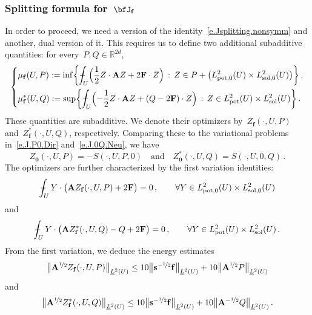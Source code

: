 \documentclass[11pt,twoside]{article} %
\numberwithin{equation}{section}
\theoremstyle{definition}
\let\originalleft\left
\let\originalright\right
\renewcommand{\left}{\mathopen{}\mathclose\bgroup\originalleft}
\renewcommand{\right}{\aftergroup\egroup\originalright}
\newcommand*{\R}{\ensuremath{\mathbb{R}}}
\newcommand{\qand}{\quad \mbox{and} \quad }
\newcommand{\f}{\mathbf{f}}
\newcommand{\s}{\mathbf{s}}
\def\Xint#1{\mathchoice
{\XXint\displaystyle\textstyle{#1}}%
{\XXint\textstyle\scriptstyle{#1}}%
{\XXint\scriptstyle\scriptscriptstyle{#1}}%
{\XXint\scriptscriptstyle\scriptscriptstyle{#1}}%
\!\int}
\def\XXint#1#2#3{{\setbox0=\hbox{$#1{#2#3}{\int}$}
\vcenter{\hbox{$#2#3$}}\kern-.5\wd0}}
\def\fint{\Xint-}
\newcommand{\Lsol}{L^2_{\mathrm{sol}}}
\newcommand{\Lsolo}{L^2_{\mathrm{sol,0}}}
\newcommand{\Lpot}{L^2_{\mathrm{pot}}}
\newcommand{\Lpoto}{L^2_{\mathrm{pot,0}}}
\newcommand{\bfA}{\mathbf{A}}
\newcommand{\bfF}{\mathbf{F}}
\begin{document}
\subsubsection{Splitting formula for~$\bfJ_{\f}$}


In order to proceed, we need a version of the identity~\eqref{e.Jsplitting.nonsymm} and another, dual version of it. This requires us to define two additional subadditive quantities:  
for every~$P ,Q \in \R^{2d}$,
\begin{equation}
\label{e.dual.smitz}
\left\{
\begin{aligned}
& \mu_{\f}(U,P)
: = \inf \biggl\{ 
\fint_{U} \Bigl( \frac12   
Z\cdot \bfA Z + 2 \bfF\cdot Z \Bigr)
\, : \, Z \in P+ \bigl( \Lpoto(U) \times  \Lsolo(U) \bigr) \biggr\}
\,,
\\ & 
\mu_{\f}^*(U,Q)
: = \sup \biggl\{ 
\fint_{U} \Bigl( - \frac12 Z \cdot \bfA Z + (Q-2\bfF) \cdot Z   \Bigr)
\, : \, Z \in \Lpot(U)\times \Lsol(U) \biggr\} 
\,.
\end{aligned}
\right.
\end{equation}
These quantities are subadditive. 
We denote their optimizers by~$Z_{\f}(\cdot,U,P)$ and~$Z_{\f}^*(\cdot,U,Q)$, respectively. Comparing these to the variational problems in~\eqref{e.J.P0.Dir} and~\eqref{e.J.0Q.Neu}, we have 
\begin{equation} 
\label{e.Z.zero.split}
Z_{\mathbf{0}}(\cdot,U,P) = - S(\cdot,U,P,0)
\qand
Z_{\mathbf{0}}^*(\cdot,U,Q) = S(\cdot,U,0,Q)
 \,.
\end{equation}
The optimizers are further characterized by the first variation identities:
\begin{equation}
\label{e.var.dual.smitz}
\fint_U Y \cdot \bigl( \bfA Z_{\f}(\cdot,U,P) +2 \bfF  \bigr) = 0 
\,,
\qquad \forall Y \in \Lpoto(U) \times  \Lsolo(U)  
\end{equation}
and
\begin{equation}
\label{e.var.dual.smitzenn}
\fint_U Y \cdot \bigl( \bfA Z^*_{\f}(\cdot,U,Q) -Q+2\bfF  \bigr) = 0
\,,
\qquad \forall Y \in \Lpot(U) \times  \Lsol(U)  
\,.
\end{equation}
From the first variation, we deduce the energy estimates
\begin{equation} 
\label{e.energy.estimate.Z}
\bigl\|\bfA^{\nicefrac12}Z_{\f}(\cdot,U,P) 
\bigr\|_{\underline{L}^2(U)} \leq 10 \bigl\|\s^{-\nicefrac12}\f 
\bigr\|_{\underline{L}^2(U)}  + 10 \bigl\|\bfA^{\nicefrac12}P
\bigr\|_{\underline{L}^2(U)}  
\end{equation}
and
\begin{equation} 
\label{e.energy.estimate.Zstar}
\bigl\|\bfA^{\nicefrac12}Z_{\f}^*(\cdot,U,Q) 
\bigr\|_{\underline{L}^2(U)} \leq 10 \bigl\|\s^{-\nicefrac12}\f 
\bigr\|_{\underline{L}^2(U)}  + 10 \bigl\|\bfA^{-\nicefrac12}Q
\bigr\|_{\underline{L}^2(U)}  
\,.
\end{equation}
\end{document}
